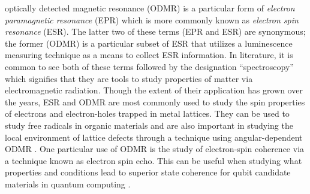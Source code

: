 \documentclass[oneside, noacknowlegments]{BYUPhys}
\begin{document}
optically detected magnetic resonance (ODMR) is a particular form of \textit{electron paramagnetic resonance} (EPR) which is more commonly known as \textit{electron spin resonance} (ESR). The latter two of these terms (EPR and ESR) are synonymous; the former (ODMR) is a particular subset of ESR that utilizes a luminescence measuring technique as a means to collect ESR information. In literature, it is common to see both of these terms followed by the designation ``spectroscopy'' which signifies that they are tools to study properties of matter via electromagnetic radiation. Though the extent of their application has grown over the years, ESR and ODMR are most commonly used to study the spin properties of electrons and electron-holes trapped in metal lattices. They can be used to study free radicals in organic materials \cite{RefWorks:doc:589299ede4b0dec22aee3bd4} and are also important in studying the local environment of lattice defects through a technique using angular-dependent ODMR \cite{RefWorks:doc:58929264e4b0d4c09201f63b}. One particular use of ODMR is the study of electron-spin coherence via a technique known as electron spin echo. This can be useful when studying what properties and conditions lead to superior state coherence for qubit candidate materials in quantum computing \cite{RefWorks:doc:58929786e4b0228a292929b8}.
\end{document}
